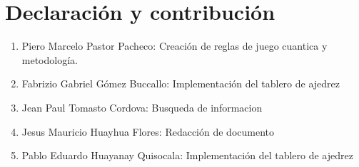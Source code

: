 \section{Declaración y contribución}
\begin{enumerate}
\item Piero Marcelo Pastor Pacheco: Creación de reglas de juego cuantica y metodología.\dotfill
\item Fabrizio Gabriel Gómez  Buccallo: Implementación del tablero de ajedrez
\item Jean Paul Tomasto Cordova: Busqueda de informacion 
\item Jesus Mauricio Huayhua Flores: Redacción de documento 
\item Pablo Eduardo Huayanay Quisocala: Implementación del tablero de ajedrez 
\end{enumerate}
